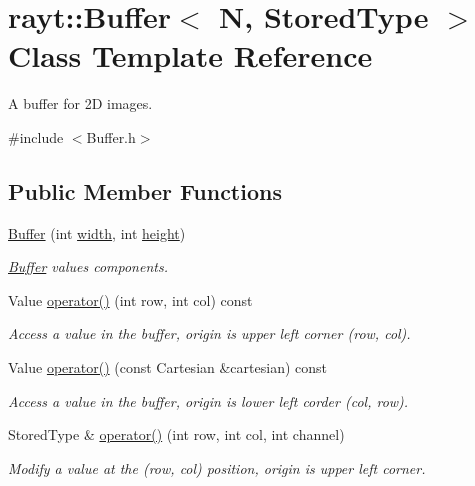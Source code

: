 \hypertarget{classrayt_1_1_buffer}{}\section{rayt\+::Buffer$<$ N, Stored\+Type $>$ Class Template Reference}
\label{classrayt_1_1_buffer}


A buffer for 2D images.  




{\ttfamily \#include $<$Buffer.\+h$>$}

\subsection*{Public Member Functions}
\begin{DoxyCompactItemize}
\item 
\mbox{\hyperlink{classrayt_1_1_buffer_aea5eaa6530d6506d47a4efee72485c42}{Buffer}} (int \mbox{\hyperlink{classrayt_1_1_buffer_a905edf4ca7a7b88dc2d3dddf7d3b50b6}{width}}, int \mbox{\hyperlink{classrayt_1_1_buffer_a575f281f1549488685df3b0a61489de9}{height}})
\begin{DoxyCompactList}\small\item\em \mbox{\hyperlink{classrayt_1_1_buffer}{Buffer}} values components. \end{DoxyCompactList}\item 
Value \mbox{\hyperlink{classrayt_1_1_buffer_ae9b4a3c2c3357ca29b1b1847c303b1f7}{operator()}} (int row, int col) const
\begin{DoxyCompactList}\small\item\em Access a value in the buffer, origin is upper left corner (row, col). \end{DoxyCompactList}\item 
Value \mbox{\hyperlink{classrayt_1_1_buffer_a168bbd5188d83c5c003c291c23a84cfd}{operator()}} (const Cartesian \&cartesian) const
\begin{DoxyCompactList}\small\item\em Access a value in the buffer, origin is lower left corder (col, row). \end{DoxyCompactList}\item 
Stored\+Type \& \mbox{\hyperlink{classrayt_1_1_buffer_aa7c3e86a02ffd0801cdff9c03222afb6}{operator()}} (int row, int col, int channel)
\begin{DoxyCompactList}\small\item\em Modify a value at the (row, col) position, origin is upper left corner. \end{DoxyCompactList}\item 

\end{DoxyCompactItemize}
